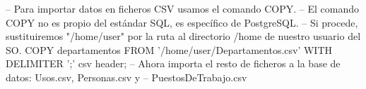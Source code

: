 \lstset{caption=Ejemplo de COPY,label=sql:copy}
\begin{SQL}
-- Para importar datos en ficheros CSV usamos el comando COPY.
-- El comando COPY no es propio del estándar SQL, es específico de PostgreSQL.
-- Si procede, sustituiremos "/home/user" por la ruta al directorio /home de nuestro usuario del SO.
COPY departamentos FROM '/home/user/Departamentos.csv' WITH DELIMITER ';' csv header;
-- Ahora importa el resto de ficheros a la base de datos: Usos.csv, Personas.csv y
-- PuestosDeTrabajo.csv
\end{SQL}
